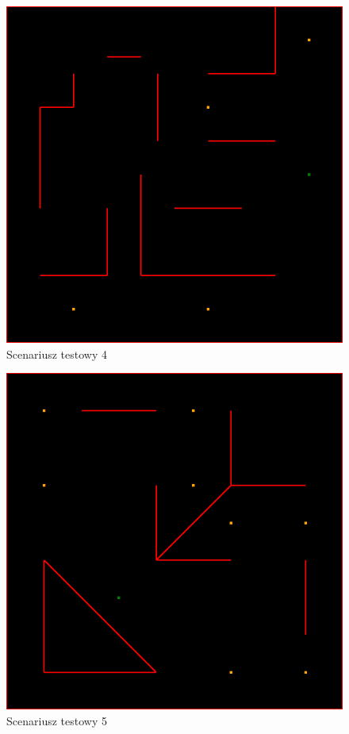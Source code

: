 \documentclass[11pt, leqno]{article}
\begin{document}
\begin{figure}[h!]
	\centering
	\includegraphics[scale=0.4]{scenario4}
	\caption{Scenariusz testowy 4}
	\label{fig:sc4}
\end{figure}

\begin{figure}[h!]
	\centering
	\includegraphics[scale=0.4]{scenario5}
	\caption{Scenariusz testowy 5}
	\label{fig:sc5}
\end{figure}
\end{document}
